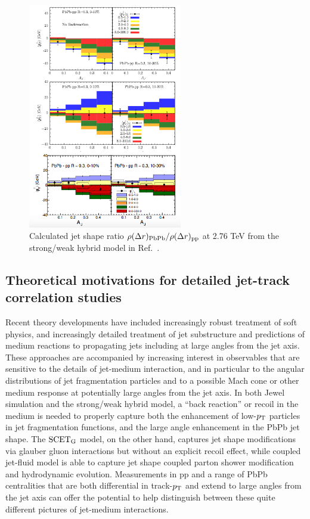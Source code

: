 \begin{figure}[ht!]
\begin{center}
\includegraphics[width=0.6\textwidth]{figures/Models/Hybrid_mpT1.png}
\caption[Missing-$p_{\rm T}$ as a function of $A_{\rm J}$ hybrid model]{Calculated jet shape ratio $\rho(\Delta r)_{\rm PbPb}/\rho(\Delta r)_{\rm pp}$ at 2.76 TeV from the strong/weak hybrid model in Ref.~\cite{Casalderrey-Solana:2016jvj}.}
\label{fig:Hybrid_mpT1}
\end{center}
\end{figure}
 
 \subsection{Theoretical motivations for detailed jet-track correlation studies}
 \label{sec:motivation}
 
Recent theory developments have included increasingly robust treatment of soft physics, and increasingly detailed treatment of jet substructure and predictions of medium reactions to propagating jets including at large angles from the jet axis.  These approaches are accompanied by increasing interest in observables that are sensitive to the details of jet-medium interaction, and in particular to the angular distributions of jet fragmentation particles and to a possible Mach cone or other medium response at potentially large angles from the jet axis.  In both {\sc Jewel} simulation and the strong/weak hybrid model, a ``back reaction'' or recoil in the medium is needed to properly capture both the enhancement of low-$p_{\rm T}$ particles in jet fragmentation functions, and the large angle enhancement in the PbPb jet shape.  The $\rm SCET_{G}$ model, on the other hand, captures jet shape modifications via glauber gluon interactions but without an explicit recoil effect, while coupled jet-fluid model is able to capture jet shape coupled parton shower modification and hydrodynamic evolution.  Measurements in pp and a range of PbPb centralities that are both differential in track-$p_{\rm T}$ and extend to large angles from the jet axis can offer the potential to help distinguish between these quite different pictures of jet-medium interactions. 

